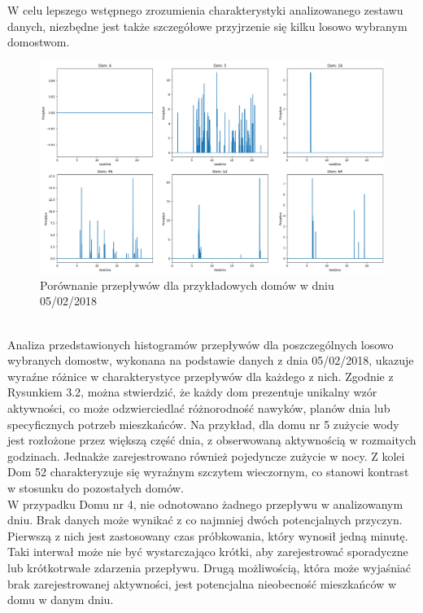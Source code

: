 \documentclass[a4paper,twoside,12pt]{book}
\begin{document}
\newpage
W celu lepszego wstępnego zrozumienia charakterystyki analizowanego zestawu danych, niezbędne jest także szczegółowe przyjrzenie się kilku losowo wybranym domostwom.\\
\begin{figure}[!h]
  \centering
  \includegraphics[width=1\textwidth]{img/Dane_nowe_compare.png}
  \caption{Porównanie przepływów dla przykładowych domów w dniu 05/02/2018}
  \label{fig:etykieta-rysunku}
\end{figure}\\
Analiza przedstawionych histogramów przepływów dla poszczególnych losowo wybranych domostw, wykonana na podstawie danych z dnia 05/02/2018, ukazuje wyraźne różnice w charakterystyce przepływów dla każdego z nich. Zgodnie z Rysunkiem 3.2, można stwierdzić, że każdy dom prezentuje unikalny wzór aktywności, co może odzwierciedlać różnorodność nawyków, planów dnia lub specyficznych potrzeb mieszkańców. Na przykład, dla domu nr 5 zużycie wody jest rozłożone przez większą część dnia, z obserwowaną aktywnością w rozmaitych godzinach. Jednakże zarejestrowano również pojedyncze zużycie w nocy. Z kolei Dom 52 charakteryzuje się wyraźnym szczytem wieczornym, co stanowi kontrast w stosunku do pozostałych domów.\\W przypadku Domu nr 4, nie odnotowano żadnego przepływu w analizowanym dniu. Brak danych może wynikać z co najmniej dwóch potencjalnych przyczyn. Pierwszą z nich jest zastosowany czas próbkowania, który wynosił jedną minutę. Taki interwał może nie być wystarczająco krótki, aby zarejestrować sporadyczne lub krótkotrwałe zdarzenia przepływu. Drugą możliwością, która może wyjaśniać brak zarejestrowanej aktywności, jest potencjalna nieobecność mieszkańców w domu w danym dniu.
\end{document}
